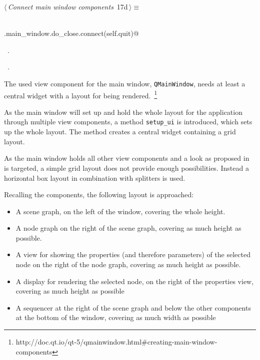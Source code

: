 \documentclass[
    a4paper,      %
    10pt,         %
    openright,    %
    notitlepage,  %
    parskip=half, %
]{scrreprt}       %
\theoremstyle{definition}                    %
\begin{document}
\begin{flushleft} \small
\begin{minipage}{\linewidth}\label{scrap10}\raggedright\small
{} $\langle\,${\itshape Connect main window components}\nobreak\ {\footnotesize {17d}}$\,\rangle\equiv$
\vspace{-1ex}
\begin{list}{}{} \item
\mbox{}\lstinline@@\\
\mbox{}\lstinline@self.main_window.do_close.connect(self.quit)@{\NWsep}
\end{list}
\vspace{-1.5ex}
\footnotesize
\begin{list}{}{\setlength{\itemsep}{-\parsep}\setlength{\itemindent}{-\leftmargin}}
\item \NWtxtMacroDefBy\ .
\item \NWtxtMacroRefIn\ .

\item{}
\end{list}
\end{minipage}\vspace{4ex}
\end{flushleft}
The used view component for the main window, \verb+QMainWindow+, needs at least
a central widget with a layout for being
rendered.~\footnote{http://doc.qt.io/qt-5/qmainwindow.html\#creating-main-window-components}

As the main window will set up and hold the whole layout for the application
through multiple view components, a method \verb+setup_ui+ is introduced, which
sets up the whole layout. The method creates a central widget containing a grid
layout.

As the main window holds all other view components and a look as proposed
in~ is targeted, a simple grid layout does
not provide enough possibilities. Instead a horizontal box layout in combination
with splitters is used.

Recalling the components, the following layout is approached:

\begin{itemize}
\item{%
    A scene graph, on the left of the window, covering the whole height.}
\item{%
    A node graph on the right of the scene graph, covering as much height as
    possible.}
\item{%
    A view for showing the properties (and therefore parameters) of the selected
    node on the right of the node graph, covering as much height as possible.}
\item{%
    A display for rendering the selected node, on the right of the properties
    view, covering as much height as possible}
\item{%
    A sequencer at the right of the scene graph and below the other components
    at the bottom of the window, covering as much width as possible}
\end{itemize}
\end{document}
